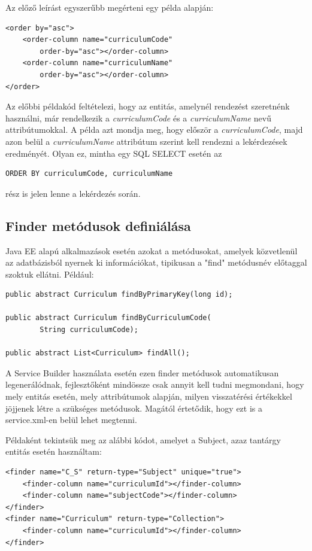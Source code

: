 \documentclass[hidelinks, 12pt, a4paper]{report}
\begin{document}
Az előző leírást egyszerűbb megérteni egy példa alapján:

\begin{lstlisting}[style=customxml]
<order by="asc">
	<order-column name="curriculumCode"
		order-by="asc"></order-column>
	<order-column name="curriculumName"
		order-by="asc"></order-column>
</order>
\end{lstlisting}

\noindent Az előbbi példakód feltételezi, hogy az entitás, amelynél rendezést szeretnénk használni, már rendelkezik a \emph{curriculumCode} és a \emph{curriculumName} nevű attribútumokkal. A példa azt mondja meg, hogy először a \emph{curriculumCode}, majd azon belül a \emph{curriculumName} attribútum szerint kell rendezni a lekérdezések eredményét. Olyan ez, mintha egy SQL SELECT esetén az
\begin{lstlisting}[style=customjava]
ORDER BY curriculumCode, curriculumName
\end{lstlisting}
rész is jelen lenne a lekérdezés során.

\subsection{Finder metódusok definiálása}

Java EE alapú alkalmazások esetén azokat a metódusokat, amelyek közvetlenül az adatbázisból nyernek ki információkat, tipikusan a "find" metódusnév előtaggal szoktuk ellátni. Például:

\begin{lstlisting}[style=customjava]
public abstract Curriculum findByPrimaryKey(long id);

public abstract Curriculum findByCurriculumCode(
		String curriculumCode);

public abstract List<Curriculum> findAll();
\end{lstlisting}

A Service Builder használata esetén ezen finder metódusok automatikusan legenerálódnak, fejlesztőként mindössze csak annyit kell tudni megmondani, hogy mely entitás esetén, mely attribútumok alapján, milyen visszatérési értékekkel jöjjenek létre a szükséges metódusok. Magától értetődik, hogy ezt is a service.xml-en belül lehet megtenni.

Példaként tekintsük meg az alábbi kódot, amelyet a Subject, azaz tantárgy entitás esetén használtam:

\begin{lstlisting}[style=customxml]
<finder name="C_S" return-type="Subject" unique="true">
	<finder-column name="curriculumId"></finder-column>
	<finder-column name="subjectCode"></finder-column>
</finder>
<finder name="Curriculum" return-type="Collection">
	<finder-column name="curriculumId"></finder-column>
</finder>
\end{lstlisting}
\end{document}
